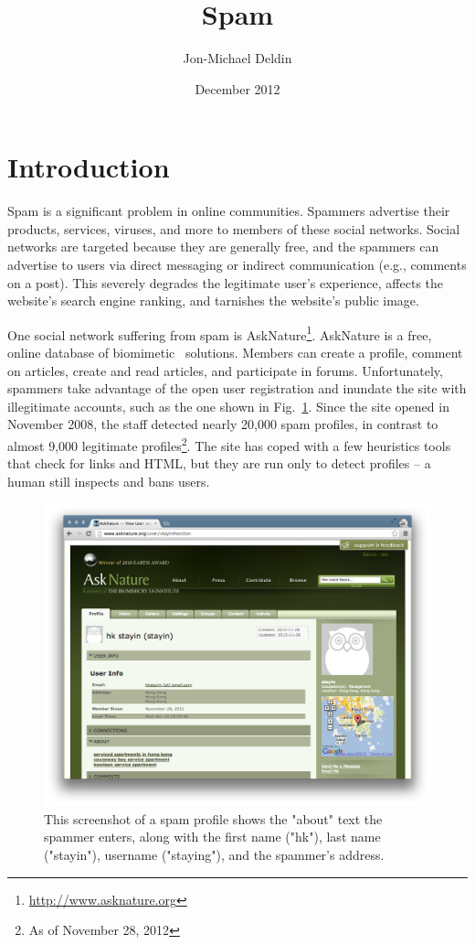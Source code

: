 \documentclass[draft,10pt]{article}
\title{Spam}
\author{Jon-Michael Deldin}
\date{December 2012}
\begin{document}
\doublespace
\section{Introduction}
Spam is a significant problem in online communities. Spammers advertise their
products, services, viruses, and more to members of these social networks.
Social networks are targeted because they are generally free, and the spammers
can advertise to users via direct messaging or indirect communication (e.g.,
comments on a post). This severely degrades the legitimate user's experience,
affects the website's search engine ranking, and tarnishes the website's
public image.

One social network suffering from spam is
AskNature\footnote{\url{http://www.asknature.org} }. AskNature is a free,
online database of biomimetic~\cite{benyus} solutions. Members can create a
profile, comment on articles, create and read articles, and participate in
forums. Unfortunately, spammers take advantage of the open user registration
and inundate the site with illegitimate accounts, such as the one shown in
Fig.~\ref{fig:spam-profile}. Since the site opened in November 2008, the staff
detected nearly 20,000 spam profiles, in contrast to almost 9,000 legitimate
profiles\footnote{As of November 28, 2012 }. The site has coped with a few
heuristics tools that check for links and HTML, but they are run only to
detect profiles -- a human still inspects and bans users.

\begin{figure}[b]
  \centering
  \includegraphics[width=\textwidth]{fig/spam-profile.png}
  \caption{This screenshot of a spam profile shows the "about" text the spammer
    enters, along with the first name ("hk"), last name ("stayin"), username
    ("staying"), and the spammer's address.}
  \label{fig:spam-profile}
\end{figure}
\end{document}
